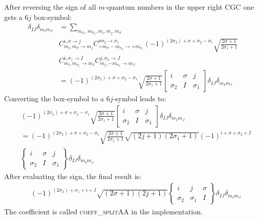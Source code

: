 \documentclass[a4paper,10pt,parskip=full]{scrartcl}
\begin{document}
After reversing the sign of all $m$-quantum numbers in the upper right
CGC one gets a $6j$ box-symbol:
\begin{equation}
  \begin{split}
    \delta_{IJ}\delta_{m_Im_J}&=
    \sum_{m_{\sigma_1},m_{\sigma_2},m_{i},m_j,m_{\sigma}}\\
    &C^{i,\sigma\rightarrow j}_{m_{i},m_{\sigma}\rightarrow m_{j}}
    C^{\sigma\sigma_2\rightarrow\sigma_1}_{+m_{\sigma}-m_{\sigma_2}\rightarrow +m_{\sigma_1}}(-1)^{(2\sigma_2)+\sigma+\sigma_2-\sigma_1}\sqrt{\frac{2\sigma+1}{2\sigma_1+1}}\\
    &C^{i,\sigma_1\rightarrow I}_{m_i,m_{\sigma_1}\rightarrow m_{I}}
    C^{j,\sigma_2\rightarrow J}_{m_j,-m_{\sigma_2}\rightarrow m_{J}}\\
    &=(-1)^{(2\sigma_2)+\sigma+\sigma_2-\sigma_1}\sqrt{\frac{2\sigma+1}{2\sigma_1+1}}
    \begin{bmatrix}
      i & \sigma & j \\
      \sigma_2 & I & \sigma_1
    \end{bmatrix}\delta_{IJ}\delta_{m_Im_J}
  \end{split}
\end{equation}
Converting the box-symbol to a $6j$-symbol leads to:
\begin{equation}
  \begin{split}
    &(-1)^{(2\sigma_2)+\sigma+\sigma_2-\sigma_1}\sqrt{\frac{2\sigma+1}{2\sigma_1+1}}
    \begin{bmatrix}
      i & \sigma & j \\
      \sigma_2 & I & \sigma_1
    \end{bmatrix}\delta_{IJ}\delta_{m_Im_J}\\
    &=(-1)^{(2\sigma_2)+\sigma+\sigma_2-\sigma_1}\sqrt{\frac{2\sigma+1}{2\sigma_1+1}}\sqrt{(2j+1)(2\sigma_1+1)}(-1)^{i+\sigma+\sigma_2+I}\\
    &\begin{Bmatrix}
      i & \sigma & j \\
      \sigma_2 & I & \sigma_1
    \end{Bmatrix}\delta_{IJ}\delta_{m_Im_J}
  \end{split}
\end{equation}
After evaluating the sign, the final result is:
\begin{equation}
  \begin{split}
    &(-1)^{(2\sigma_2)+\sigma_1+i+I}\sqrt{(2\sigma+1)(2j+1)}
    \begin{Bmatrix}
      i & j & \sigma \\
      \sigma_2 & \sigma_1 & I
    \end{Bmatrix}\delta_{IJ}\delta_{m_Im_J}
  \end{split}
\end{equation}
The coefficient is called \textsc{coeff\_splitAA} in the
implementation.
\end{document}

